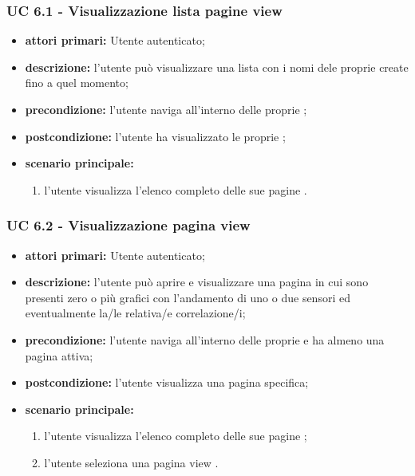 			\subsubsection{UC 6.1 - Visualizzazione lista pagine view}
			\begin{itemize}
				\item \textbf{attori primari:} Utente autenticato;
				\item \textbf{descrizione:} l'utente può visualizzare una lista con i nomi dele proprie  create fino a quel momento;
				\item \textbf{precondizione:} l'utente naviga all'interno delle proprie ;
				\item \textbf{postcondizione:} l'utente ha visualizzato le proprie ;
				\item \textbf{scenario principale:}
				\begin{enumerate}
					\item{l'utente visualizza l'elenco completo delle sue pagine .}
				\end{enumerate}	
			\end{itemize}

			\subsubsection{UC 6.2 - Visualizzazione pagina view}
			\begin{itemize}
				\item \textbf{attori primari:} Utente autenticato;
				\item \textbf{descrizione:} l'utente può aprire e visualizzare una pagina  in cui sono presenti zero o più grafici con l'andamento di uno o due sensori ed eventualmente la/le relativa/e correlazione/i;
				\item \textbf{precondizione:} l'utente naviga all'interno delle proprie  e ha almeno una pagina  attiva;
				\item \textbf{postcondizione:} l'utente visualizza una pagina  specifica;
				\item \textbf{scenario principale:}
				\begin{enumerate}
					\item{l'utente visualizza l'elenco completo delle sue pagine ;}
					\item{l'utente seleziona una pagina view .}
				\end{enumerate}	
			\end{itemize}

